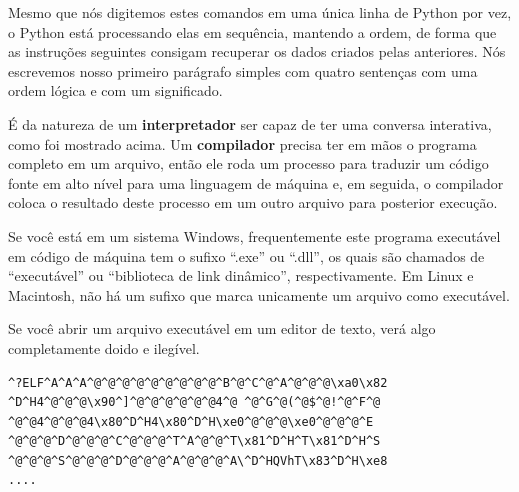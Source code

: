 Mesmo que nós digitemos estes comandos em uma única linha de Python por vez, o Python
está processando elas em sequência, mantendo a ordem, de forma que as
instruções seguintes consigam recuperar os dados criados pelas anteriores. Nós escrevemos
nosso primeiro parágrafo simples com quatro sentenças com uma ordem lógica e com um
significado.
%

É da natureza de um {\bf interpretador} ser capaz de ter uma conversa interativa, como
foi mostrado acima. Um {\bf compilador} precisa ter em mãos o programa completo em um arquivo, então ele roda um processo para traduzir um código fonte em alto nível para uma linguagem
de máquina e, em seguida, o compilador coloca o resultado deste processo em um outro arquivo
para posterior execução.
%

Se você está em um sistema Windows, frequentemente este programa executável em código
de máquina tem o sufixo ``.exe'' ou ``.dll'', os quais são chamados de ``executável'' ou
``biblioteca de link dinâmico'', respectivamente. Em Linux e Macintosh, não há um sufixo
que marca unicamente um arquivo como executável.
%

Se você abrir um arquivo executável em um editor de texto, verá algo completamente
doido e ilegível.
%

\beforeverb
\begin{verbatim}
^?ELF^A^A^A^@^@^@^@^@^@^@^@^@^B^@^C^@^A^@^@^@\xa0\x82
^D^H4^@^@^@\x90^]^@^@^@^@^@^@4^@ ^@^G^@(^@$^@!^@^F^@
^@^@4^@^@^@4\x80^D^H4\x80^D^H\xe0^@^@^@\xe0^@^@^@^E
^@^@^@^D^@^@^@^C^@^@^@^T^A^@^@^T\x81^D^H^T\x81^D^H^S
^@^@^@^S^@^@^@^D^@^@^@^A^@^@^@^A\^D^HQVhT\x83^D^H\xe8
....
\end{verbatim}
\afterverb


